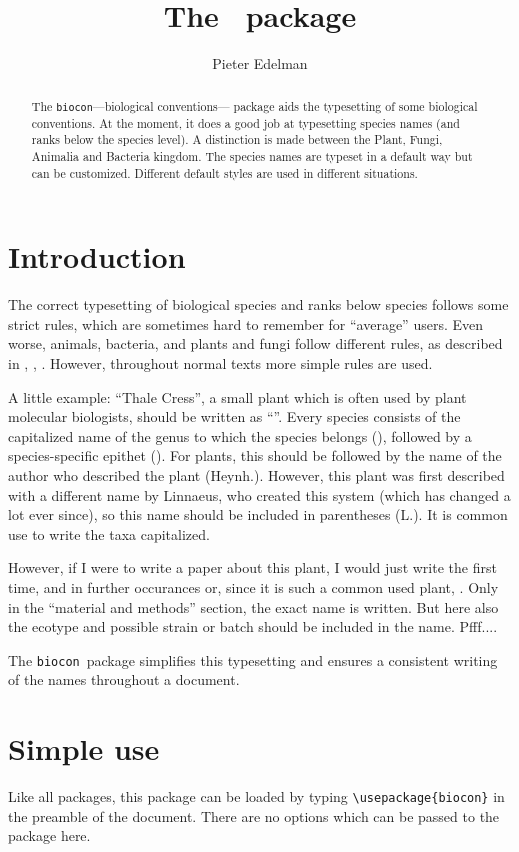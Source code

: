 \documentclass{article}
\title{The \biocon\ package}
\author{Pieter Edelman}
\newcommand{\biocon}{\texttt{biocon}}
\begin{document}
\maketitle
\tableofcontents

\begin{abstract}
The \biocon---biological conventions--- package aids the typesetting of some biological conventions. At the moment, it does a good job at typesetting species names (and ranks below the species level). A distinction is made between the Plant, Fungi, Animalia and Bacteria kingdom. The species names are typeset in a default way but can be customized. Different default styles are used in different situations.
\end{abstract}
\section{Introduction}
The correct typesetting of biological species and ranks below species follows some strict rules, which are sometimes hard to remember for ``average'' users. Even worse, animals, bacteria, and plants and fungi follow different rules, as described in \cite{Animals}, \cite{Bacteria}, \cite{Plants}. However, throughout normal texts more simple rules are used.

A little example: ``Thale Cress'', a small plant which is often used by plant molecular biologists, should be written as ``''. Every species consists of the capitalized name of the genus to which the species belongs (), followed by a species-specific epithet (). For plants, this should be followed by the name of the author who described the plant (Heynh.). However, this plant was first described with a different name by Linnaeus, who created this system (which has changed a lot ever since), so this name should be included in parentheses (L.). It is common use to write the taxa capitalized.

However, if I were to write a paper about this plant, I would just write  the first time, and in further occurances  or, since it is such a common used plant, . Only in the ``material and methods'' section, the exact name is written. But here also the ecotype and possible strain or batch should be included in the name. Pfff....

The \biocon\ package simplifies this typesetting and ensures a consistent writing of the names throughout a document.
\section{Simple use}
Like all packages, this package can be loaded by typing \verb!\usepackage{biocon}! in the preamble of the document. There are no options which can be passed to the package here.
\end{document}
